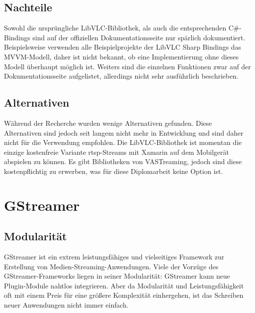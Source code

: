 \subsection{Nachteile}
Sowohl die ursprüngliche LibVLC-Bibliothek, als auch die entsprechenden C\#-Bindings sind auf der offiziellen Dokumentationsseite nur spärlich dokumentiert.\cite[vgl.][]{libvlc-sharp-doc}
Beispielsweise verwenden alle Beispielprojekte der LibVLC Sharp Bindings das MVVM-Modell, daher ist nicht bekannt, ob eine Implementierung ohne dieses Modell überhaupt möglich ist.
Weiters sind die einzelnen Funktionen zwar auf der Dokumentationsseite aufgelistet, allerdings nicht sehr ausführlich beschrieben. \cite[vgl.][]{libvlc-sharp-doc}

\subsection{Alternativen}
Während der Recherche wurden wenige Alternativen gefunden. Diese Alternativen sind jedoch seit langem nicht mehr in Entwicklung und sind daher nicht für die Verwendung empfohlen. Die LibVLC-Bibliothek ist momentan die einzige kostenfreie Variante \acs{rtsp}-Streams mit Xamarin auf dem Mobilgerät abspielen zu können. Es gibt Bibliotheken von VASTreaming, jedoch sind diese kostenpflichtig zu erwerben, was für diese Diplomarbeit keine Option ist. \cite[vgl.][Pricing]{vastreaming}

\section{GStreamer}
\subsection{Modularität}
GStreamer ist ein extrem leistungsfähiges und vielseitiges Framework zur Erstellung von Medien-Streaming-Anwendungen.
Viele der Vorzüge des GStreamer-Frameworks liegen in seiner Modularität:
GStreamer kann neue Plugin-Module nahtlos integrieren.
Aber da Modularität und Leistungsfähigkeit oft mit einem Preis für eine größere Komplexität einhergehen, ist das Schreiben neuer Anwendungen nicht immer einfach.
\cite[aus dem Englischen übersetzt]{gstreamer}\par

